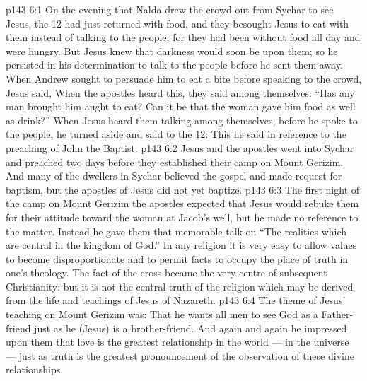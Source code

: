 \vs p143 6:1 On the evening that Nalda drew the crowd out from Sychar to see Jesus, the 12 had just returned with food, and they besought Jesus to eat with them instead of talking to the people, for they had been without food all day and were hungry. But Jesus knew that darkness would soon be upon them; so he persisted in his determination to talk to the people before he sent them away. When Andrew sought to persuade him to eat a bite before speaking to the crowd, Jesus said,  When the apostles heard this, they said among themselves: “Has any man brought him aught to eat? Can it be that the woman gave him food as well as drink?” When Jesus heard them talking among themselves, before he spoke to the people, he turned aside and said to the 12:  This he said in reference to the preaching of John the Baptist.
\vs p143 6:2 Jesus and the apostles went into Sychar and preached two days before they established their camp on Mount Gerizim. And many of the dwellers in Sychar believed the gospel and made request for baptism, but the apostles of Jesus did not yet baptize.
\vs p143 6:3 \pc The first night of the camp on Mount Gerizim the apostles expected that Jesus would rebuke them for their attitude toward the woman at Jacob’s well, but he made no reference to the matter. Instead he gave them that memorable talk on “The realities which are central in the kingdom of God.” In any religion it is very easy to allow values to become disproportionate and to permit facts to occupy the place of truth in one’s theology. The fact of the cross became the very centre of subsequent Christianity; but it is not the central truth of the religion which may be derived from the life and teachings of Jesus of Nazareth.
\vs p143 6:4 The theme of Jesus’ teaching on Mount Gerizim was: That he wants all men to see God as a Father\hyp{}friend just as he (Jesus) is a brother\hyp{}friend. And again and again he impressed upon them that love is the greatest relationship in the world --- in the universe --- just as truth is the greatest pronouncement of the observation of these divine relationships.
